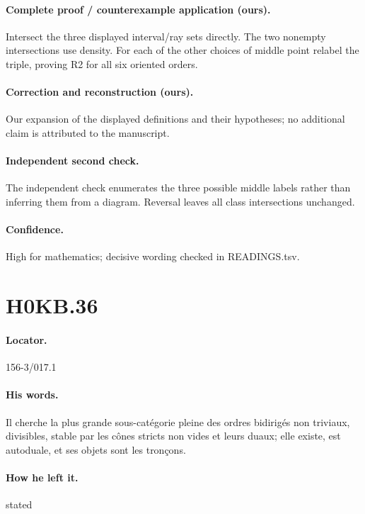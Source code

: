 \paragraph{Complete proof / counterexample application (ours).} Intersect the three displayed interval/ray sets directly. The two nonempty intersections use density. For each of the other choices of middle point relabel the triple, proving R2 for all six oriented orders.

\paragraph{Correction and reconstruction (ours).} Our expansion of the displayed definitions and their hypotheses; no additional claim is attributed to the manuscript.

\paragraph{Independent second check.} The independent check enumerates the three possible middle labels rather than inferring them from a diagram. Reversal leaves all class intersections unchanged.

\paragraph{Confidence.} High for mathematics; decisive wording checked in READINGS.tsv.

\section*{H0KB.36}\label{statement:H0KB.36}
\paragraph{Locator.} 156-3/017.1

\paragraph{His words.} Il cherche la plus grande sous-catégorie pleine des ordres bidirigés non triviaux, divisibles, stable par les cônes stricts non vides et leurs duaux; elle existe, est autoduale, et ses objets sont les tronçons.

\paragraph{How he left it.} stated

